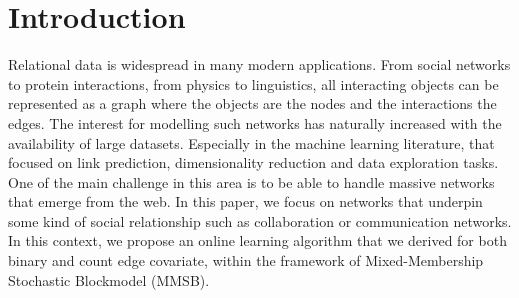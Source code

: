 \section{Introduction}

Relational data is widespread in many modern applications. From social networks to protein interactions, from physics to linguistics, all interacting objects can be represented as a graph where the objects are the nodes and the interactions the edges. The interest for modelling such networks has naturally increased with the availability of large datasets. Especially in the machine learning literature, that focused on link prediction, dimensionality reduction and data exploration tasks. One of the main challenge in this area is to be able to handle massive networks that emerge from the web. In this paper, we focus on networks that underpin some kind of social relationship such as collaboration or communication networks. In this context, we propose an online learning algorithm that we derived for both binary and count edge covariate, within the framework of Mixed-Membership Stochastic Blockmodel (MMSB).


